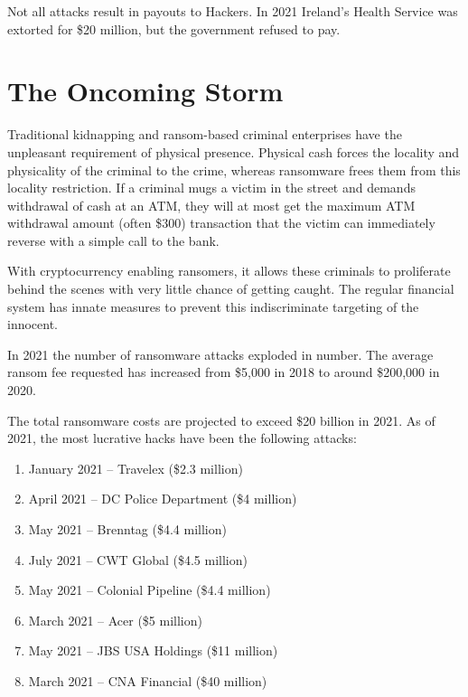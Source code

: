 
Not all attacks result in payouts to Hackers. In 2021 Ireland's Health Service
was extorted for \$20 million, but the government refused to pay.

\section{The Oncoming Storm}

Traditional kidnapping and ransom-based criminal enterprises have the unpleasant
requirement of physical presence. Physical cash forces the locality and
physicality of the criminal to the crime, whereas ransomware frees them from
this locality restriction. If a criminal mugs a victim in the street and demands
withdrawal of cash at an ATM, they will at most get the maximum ATM withdrawal
amount (often \$300) transaction that the victim can immediately reverse with a
simple call to the bank.

With cryptocurrency enabling ransomers, it allows these criminals to proliferate
behind the scenes with very little chance of getting caught. The regular
financial system has innate measures to prevent this indiscriminate targeting of
the innocent.

In 2021 the number of ransomware attacks exploded in number. The average ransom
fee requested has increased from \$5,000 in 2018 to around \$200,000 in 2020.

The total ransomware costs are projected to exceed \$20 billion in 2021. As of
2021, the most lucrative hacks have been the following attacks:

\begin{enumerate}
  \item January 2021 -- Travelex (\$2.3 million)
  \item April 2021 -- DC Police Department (\$4 million)
  \item May 2021 -- Brenntag (\$4.4 million)
  \item July 2021 -- CWT Global (\$4.5 million)
  \item May 2021 -- Colonial Pipeline (\$4.4 million)
  \item March 2021 -- Acer (\$5 million)
  \item May 2021 -- JBS USA Holdings (\$11 million)
  \item March 2021 -- CNA Financial (\$40 million)
\end{enumerate}

